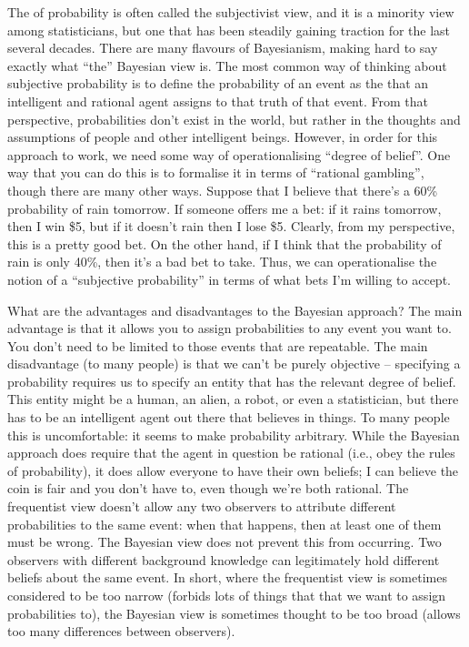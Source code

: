 
The  of probability is often called the subjectivist view, and it is a minority view among statisticians, but one that has been steadily gaining traction for the last several decades. There are many flavours of Bayesianism, making hard to say exactly what ``the'' Bayesian view is. The most common way of thinking about subjective probability is to define the probability of an event as the  that an intelligent and rational agent assigns to that truth of that event. From that perspective, probabilities don't exist in the world, but rather in the thoughts and assumptions of people and other intelligent beings.
However, in order for this approach to work, we need some way of operationalising ``degree of belief''. One way that you can do this is to formalise it in terms of ``rational gambling'', though there are many other ways. Suppose that I believe that there's a 60\% probability of rain tomorrow. If someone offers me a bet: if it rains tomorrow, then I win \$5, but if it doesn't rain then I lose \$5. Clearly, from my perspective, this is a pretty good bet. On the other hand, if I think that the probability of rain is only 40\%, then it's a bad bet to take. Thus, we can operationalise the notion of a ``subjective probability'' in terms of what bets I'm willing to accept. 

What are the advantages and disadvantages to the Bayesian approach? The main advantage is that it allows you to assign probabilities to any event you want to. You don't need to be limited to those events that are repeatable. The main disadvantage (to many people) is that we can't be purely objective -- specifying a probability requires us to specify an entity that has the relevant degree of belief. This entity might be a human, an alien, a robot, or even a statistician, but there has to be an intelligent agent out there that believes in things. To many people this is uncomfortable: it seems to make probability arbitrary. While the Bayesian approach does require that the agent in question be rational (i.e., obey the rules of probability), it does allow everyone to have their own beliefs; I can believe the coin is fair and you don't have to, even though we're both rational. The frequentist view doesn't allow any two observers to attribute different probabilities to the same event: when that happens, then at least one of them must be wrong. The Bayesian view does not prevent this from occurring. Two observers with different background knowledge can legitimately hold different beliefs about the same event. In short, where the frequentist view is sometimes considered to be too narrow (forbids lots of things that that we want to assign probabilities to), the Bayesian view is sometimes thought to be too broad (allows too many differences between observers). 



